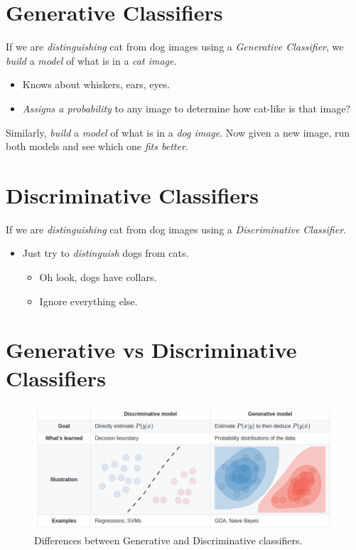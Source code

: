 \documentclass[
	number={4},
	title={Logistic Regression}
]{cs584notes}
\begin{document}
\section{Generative Classifiers}\label{sec:generative-classifiers}
If we are \emph{distinguishing} cat from dog images using a \emph{Generative Classifier}, we \emph{build} a \emph{model} of what is in a \emph{cat image}.
\begin{itemize}
	\item Knows about whiskers, ears, eyes.
	\item \emph{Assigns a probability} to any image to determine how cat-like is that image?
\end{itemize}
Similarly, \emph{build} a \emph{model} of what is in a \emph{dog image}.
Now given a new image, run both models and see which one \emph{fits better}.

\section{Discriminative Classifiers}\label{sec:discriminative-classifiers}
If we are \emph{distinguishing} cat from dog images using a \emph{Discriminative Classifier}.
\begin{itemize}
	\item Just try to \emph{distinguish} dogs from cats.
	\begin{itemize}
		\item Oh look, dogs have collars.
		\item Ignore everything else.
	\end{itemize}
\end{itemize}

\section{Generative vs Discriminative Classifiers}\label{sec:generative-vs-discriminative-classifiers}
\begin{figure}[H]
	\centering
	\includegraphics[width=\textwidth]{figures/4/classifiers}
	\caption{Differences between Generative and Discriminative classifiers.}
	\label{fig:classifiers}
\end{figure}
\end{document}
